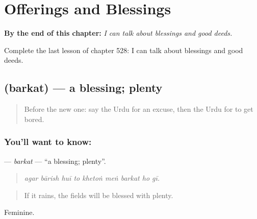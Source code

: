 
\chapter{Offerings and Blessings}
\label{ch:ur-offerings-and-blessings}

\begin{chapteropening}
\textbf{By the end of this chapter:} \emph{I can talk about blessings and good deeds.}

Complete the last lesson of chapter 528: I can talk about blessings and good deeds.
\end{chapteropening}

\section[\texorpdfstring{\ur{برکت} (barkat)}{برکت (barkat)}]{ (barkat) — a blessing; plenty}

\label{lesson:UR-C528-barkat}



\begin{quote}
Before the new one: say the Urdu for an excuse, then the Urdu for to get bored.
\end{quote}

\subsection*{You'll want to know: }
\textbf{} — \emph{barkat} — \textquotedblleft{}a blessing; plenty\textquotedblright{}.

\begin{quote}
        
\end{quote}

\begin{quote}
\emph{agar bārish huī to khetoṅ meṅ barkat ho gī.}
\end{quote}

\begin{quote}
If it rains, the fields will be blessed with plenty.
\end{quote}

Feminine.


